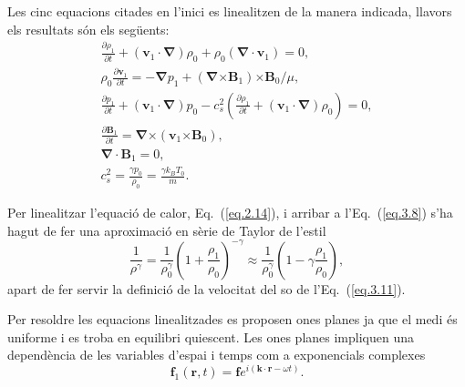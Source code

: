 \documentclass[12pt,a4paper]{article}
\numberwithin{equation}{section}
\newcommand{\divBp}{\bm{\nabla} \cdot \bm{B}_1}
\begin{document}
Les cinc equacions citades en l'inici es linealitzen de la manera indicada, llavors els resultats són els següents:
\begin{gather}
    \frac{\partial \rho_1}{\partial t} + (\bm{v}_1 \cdot \bm{\nabla}) \rho_0 + \rho_0 (\bm{\nabla} \cdot \bm{v}_1) = 0, \tag{3.6} \label{eq.3.6} \\
    \rho_0 \frac{\partial \bm{v}_1}{\partial t} = - \bm{\nabla} p_1 + (\bm{\nabla} \bm{\times} \bm{B}_1) \bm{\times} \bm{B}_0 / \mu, \tag{3.7} \label{eq.3.7} \\
    \frac{\partial p_1}{\partial t} + (\bm{v}_1 \cdot \bm{\nabla}) p_0 - c_s^2 \left( \frac{\partial \rho_1}{\partial t} + (\bm{v}_1 \cdot \bm{\nabla}) \rho_0 \right) = 0, \tag{3.8} \label{eq.3.8} \\
    \frac{\partial \bm{B}_1}{\partial t} = \bm{\nabla} \bm{\times} (\bm{v}_1 \bm{\times} \bm{B}_0), \tag{3.9} \label{eq.3.9} \\
    \divBp = 0, \tag{3.10} \label{eq.3.10} \\
    c_s^2 = \frac{\gamma p_0}{\rho_0} = \frac{\gamma k_B T_0}{m}. \tag{3.11} \label{eq.3.11}
\end{gather}

Per linealitzar l'equació de calor, Eq.~(\ref{eq.2.14}), i arribar a l'Eq.~(\ref{eq.3.8}) s'ha hagut de fer una aproximació en sèrie de Taylor de l'estil
\begin{equation}
    \frac{1}{\rho^{\gamma}} = \frac{1}{\rho_0^{\gamma}} \left( 1 + \frac{\rho_1}{\rho_0} \right)^{-\gamma} \approx \frac{1}{\rho_0^{\gamma}} \left( 1 - \gamma \frac{\rho_1}{\rho_0} \right), \tag{3.12} \label{eq.3.12}
\end{equation}
apart de fer servir la definició de la velocitat del so de l'Eq.~(\ref{eq.3.11}).

Per resoldre les equacions linealitzades es proposen ones planes ja que el medi és uniforme i es troba en equilibri quiescent.
Les ones planes impliquen una dependència de les variables d'espai i temps com a exponencials complexes
\begin{equation}
    \bm{f}_1(\bm{r},t) = \bm{f} e^{i(\bm{k} \cdot \bm{r} - \omega t)}. \tag{3.13} \label{3.13}
\end{equation}
\end{document}
